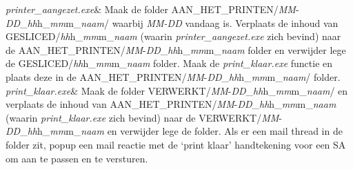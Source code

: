\documentclass{article}
\begin{document}
\begin{table}[H]
\begin{tabular}
\textit{printer\_aangezet.exe}& 
Maak de folder AAN\_HET\_PRINTEN/\textit{MM}-\textit{DD}\_\textit{hh}h\_\textit{mm}m\_\textit{naam}/ waarbij \textit{MM-DD} vandaag is. Verplaats de inhoud van GESLICED/\textit{hh}h\_\textit{mm}m\_\textit{naam} (waarin \textit{printer\_aangezet.exe} zich bevind) naar de AAN\_HET\_PRINTEN/\textit{MM}-\textit{DD}\_\textit{hh}h\_\textit{mm}m\_\textit{naam} folder en verwijder lege de GESLICED/\textit{hh}h\_\textit{mm}m\_\textit{naam} folder. Maak de \textit{print\_klaar.exe} functie en plaats deze in de AAN\_HET\_PRINTEN/\textit{MM}-\textit{DD}\_\textit{hh}h\_\textit{mm}m\_\textit{naam}/ folder.\\

\textit{print\_klaar.exe}& Maak de folder VERWERKT/\textit{MM}-\textit{DD}\_\textit{hh}h\_\textit{mm}m\_\textit{naam}/ en verplaats de inhoud van AAN\_HET\_PRINTEN/\textit{MM}-\textit{DD}\_\textit{hh}h\_\textit{mm}m\_\textit{naam} (waarin \textit{print\_klaar.exe} zich bevind) naar de VERWERKT/\textit{MM}-\textit{DD}\_\textit{hh}h\_\textit{mm}m\_\textit{naam} en verwijder lege de folder. Als er een mail thread in de folder zit, popup een mail reactie met de `print klaar' handtekening voor een SA om aan te passen en te versturen.\\

    \end{tabular}
\end{table}
\end{document}

